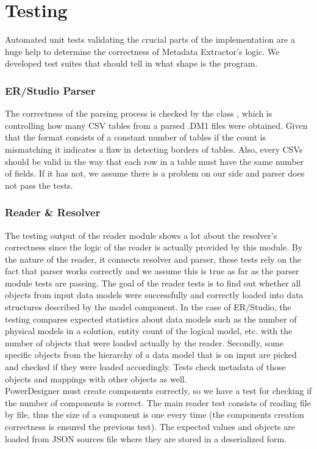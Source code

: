 \section{Testing}

Automated unit tests validating the crucial parts of the implementation are a huge help to determine the correctness of Metadata Extractor's logic. 
We developed test suites that should tell in what shape is the program.

\subsubsection{ER/Studio Parser}

The correctness of the parsing process is checked by the class , which is controlling how many CSV tables from a parsed .DM1 files were obtained. Given that the format consists of a constant number of tables if the count is mismatching it indicates a flaw in detecting borders of tables.
Also, every CSVs should be valid in the way that each row in a table must have the same number of fields. If it has not, we assume there is a problem on our side and parser does not pass the tests.

\subsubsection{Reader \& Resolver}

The testing output of the reader module shows a lot about the resolver's correctness since the logic of the reader is actually provided by this module. 
By the nature of the reader, it connects resolver and parser, these tests rely on the fact that parser works correctly and we assume this is true as far as the parser module tests are passing.
The goal of the reader tests is to find out whether all objects from input data models were successfully and correctly loaded into data structures described by the model component.
In the case of ER/Studio, the testing compares expected statistics about data models such as the number of physical models in a solution, entity count of the logical model, etc. with the number of objects that were loaded actually by the reader.
Secondly, some specific objects from the hierarchy of a data model that is on input are picked and checked if they were loaded accordingly. Tests check metadata of those objects and mappings with other objects as well. \\ 

PowerDesigner must create components correctly, so we have a test for checking if the number of components is correct.
The main reader test consists of reading file by file, thus the size of a component is one every time (the components creation correctness is ensured the previous test).
The expected values and objects are loaded from JSON sources file where they are stored in a deserialized form.

